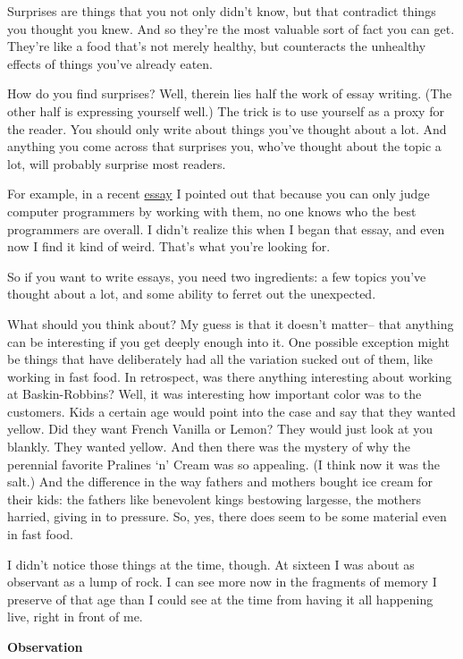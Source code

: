 \documentclass[12pt]{book}
\begin{document}
Surprises are things that you not only didn't know, but that contradict
things you thought you knew. And so they're the most valuable sort of
fact you can get. They're like a food that's not merely healthy, but
counteracts the unhealthy effects of things you've already eaten.

How do you find surprises? Well, therein lies half the work of essay
writing. (The other half is expressing yourself well.) The trick is to
use yourself as a proxy for the reader. You should only write about
things you've thought about a lot. And anything you come across that
surprises you, who've thought about the topic a lot, will probably
surprise most readers.

For example, in a recent \href{gh.html}{essay} I pointed out that
because you can only judge computer programmers by working with them, no
one knows who the best programmers are overall. I didn't realize this
when I began that essay, and even now I find it kind of weird. That's
what you're looking for.

So if you want to write essays, you need two ingredients: a few topics
you've thought about a lot, and some ability to ferret out the
unexpected.

What should you think about? My guess is that it doesn't matter-- that
anything can be interesting if you get deeply enough into it. One
possible exception might be things that have deliberately had all the
variation sucked out of them, like working in fast food. In retrospect,
was there anything interesting about working at Baskin-Robbins? Well, it
was interesting how important color was to the customers. Kids a certain
age would point into the case and say that they wanted yellow. Did they
want French Vanilla or Lemon? They would just look at you blankly. They
wanted yellow. And then there was the mystery of why the perennial
favorite Pralines `n' Cream was so appealing. (I think now it was the
salt.) And the difference in the way fathers and mothers bought ice
cream for their kids: the fathers like benevolent kings bestowing
largesse, the mothers harried, giving in to pressure. So, yes, there
does seem to be some material even in fast food.

I didn't notice those things at the time, though. At sixteen I was about
as observant as a lump of rock. I can see more now in the fragments of
memory I preserve of that age than I could see at the time from having
it all happening live, right in front of me.

\textbf{Observation}
\end{document}
